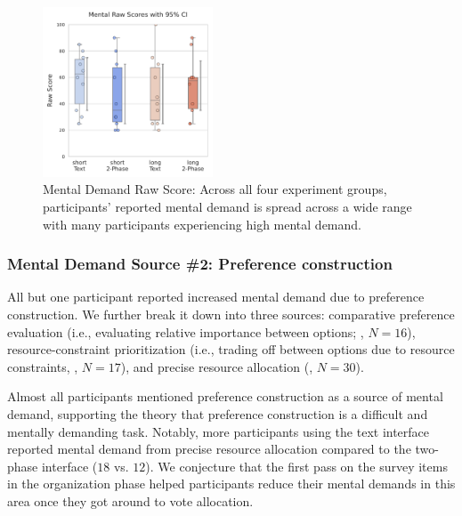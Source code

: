\begin{figure} %
   \centering
    \includegraphics[width=0.45\textwidth, trim=0 13 0 13, clip]{content/image/cog/Mental_scores.pdf}
    \captionsetup{width=0.4\textwidth, justification=justified}
    \caption{Mental Demand Raw Score: Across all four experiment groups, participants' reported mental demand is spread across a wide range with many participants experiencing high mental demand.}
    \label{fig:mental_cog_score}
\end{figure}

\subsubsection{Mental Demand Source \#2: Preference construction}
All but one participant reported increased mental demand due to preference construction. We further break it down into three sources: comparative preference evaluation (i.e., evaluating relative importance between options; , $N=16$), resource-constraint prioritization (i.e., trading off between options due to resource constraints, , $N=17$), and precise resource allocation (, $N=30$).

Almost all participants mentioned preference construction as a source of mental demand, supporting the theory that preference construction is a difficult and mentally demanding task. Notably, more participants using the text interface reported mental demand from precise resource allocation compared to the two-phase interface ($18$ vs. $12$). We conjecture that the first pass on the survey items in the organization phase helped participants reduce their mental demands in this area once they got around to vote allocation.

